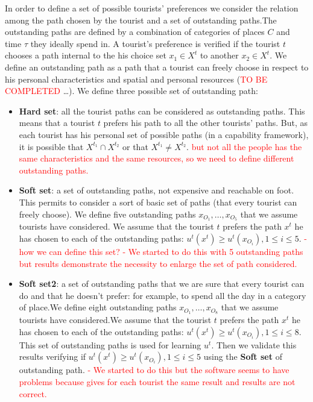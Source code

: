 \documentclass[a4paper]{article}
\begin{document}
In order to define a set of  possible tourists' preferences we consider the relation among the path chosen by the tourist and a set of outstanding paths.The outstanding paths are defined by a combination of categories of places $C$ and time $\tau$ they ideally spend in. A tourist's preference is verified if the tourist $t$ chooses a path internal to the his choice set $x_1 \in X^t$ to another $x_2 \in X^t$. We define an outstanding path as a path that a tourist can freely choose in respect to his personal characteristics and spatial and personal resources (\textcolor{red}{TO BE COMPLETED} \dots). We define three possible set of outstanding path:
                                            \begin{itemize}
                                                \item \textbf{Hard set}: all the tourist paths can be considered as outstanding paths. This means that a tourist $t$ prefers his path to all the other tourists' paths. But, as each tourist has his personal set of possible paths (in a capability framework), it is possible that $X^{t_1}\cap X^{t_2}$ or that $X^{t_1}\neq X^{t_2}$.
                                                    \subitem {-} \textcolor{red}{but not all the people has the same characteristics and the same resources, so we need to define different outstanding paths.}
                                                \item \textbf{Soft set}: a set of outstanding paths, not expensive and reachable on foot. This permits to consider a sort of basic set of paths (that every tourist can freely choose). We define five outstanding paths $x_{O_1}, \ldots, x_{O_5}$ that we assume tourists have considered. We assume that the tourist $t$ prefers the path $x^t$ he has chosen to each of the outstanding paths: $u^t(x^t) \geq u^t(x_{O_i}), 1 \leq  i \leq 5$.
                                                    \textcolor{red}{
                                                    \subitem - how we can define this set?
                                                    \subitem - We started to do this with 5 outstanding paths but results demonstrate the necessity to enlarge the set of path considered.}
                                                \item \textbf{Soft set2}: a set of outstanding paths that we are sure that every tourist can do and that he doesn't prefer: for example, to spend all the day in a category of place.We define eight outstanding paths $x_{O_1}, \ldots, x_{O_8}$ that we assume tourists have considered.We assume that the tourist $t$ prefers the path $x^t$ he has chosen to each of the outstanding paths: $u^t(x^t) \geq u^t(x_{O_i}), 1 \leq  i \leq 8$. This set of outstanding paths is used for learning $u^t$. Then we validate this results verifying if $u^t(x^t)\geq u^t(x_{O_i}), 1 \leq  i \leq 5$ using the \textbf{Soft set} of outstanding path.
                                                    \textcolor{red}{
                                                    \subitem - We started to do this but the software seems to have problems because gives for each tourist the same result and results are not correct.}
                                              \end{itemize}
\end{document}
